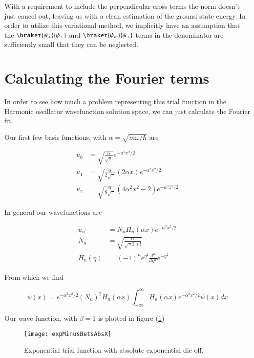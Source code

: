 With a requirement to include the perpendicular cross terms the norm doesn't just cancel out, leaving us with a clean estimation of the ground state energy.  In order to utilize this variational method, we implicitly have an assumption that the $\braket{\psi_\perp}{\psi_\perp}$ and $\braket{\psi_m}{\psi_\perp}$ terms in the denominator are sufficiently small that they can be neglected.

\section{Calculating the Fourier terms}

In order to see how much a problem representing this trial function in the Harmonic oscillator wavefunction solution space, we can just calculate the Fourier fit.

Our first few basis functions, with $\alpha = \sqrt{m \omega/\hbar}$ are

\begin{align*}
u_0 &= \sqrt{\frac{\alpha}{\sqrt{\pi}}} e^{-\alpha^2 x^2/2} \\
u_1 &= \sqrt{\frac{\alpha}{2 \sqrt{\pi}}} (2 \alpha x) e^{-\alpha^2 x^2/2} \\
u_2 &= \sqrt{\frac{\alpha}{8 \sqrt{\pi}}} (4 \alpha^2 x^2 - 2) e^{-\alpha^2 x^2/2}
\end{align*}

In general our wavefunctions are

\begin{align*}
u_n &= N_n H_n(\alpha x) e^{-\alpha^2 x^2/2} \\
N_n &= \sqrt{
\frac{\alpha}{\sqrt{\pi} 2^n n!}
} \\
H_n(\eta) &= (-1)^n e^{\eta^2} \frac{d^n}{d\eta^n} e^{-\eta^2}
\end{align*}

From which we find 

\begin{equation}\label{eqn:variationHarmonicOscillator:471}
\psi(x) = e^{-\alpha^2 x^2/2} (N_n)^2 H_n(\alpha x) \int_{-\infty}^\infty H_n(\alpha x) e^{-\alpha^2 x^2/2} \psi(x) dx
\end{equation}

Our wave function, with $\beta=1$ is plotted in figure (\ref{fig:expMinusBetsAbsX})

\begin{figure}[htp]
\centering
\texttt{[image: expMinusBetsAbsX]}
\caption{Exponential trial function with absolute exponential die off.}\label{fig:expMinusBetsAbsX}
\end{figure}

